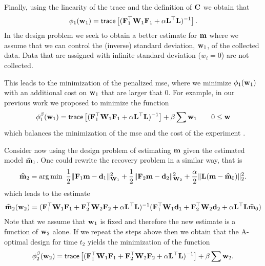 \documentclass[11pt]{article}
\newcommand{\bfC}	{{\bf{C}}}
\newcommand{\bfF}	{{\bf{F}}}
\newcommand{\bfL}	{{\bf{L}}}
\newcommand{\bfW}	{{\bf{W}}}
\newcommand{\bfd}	{{\bf{d}}}
\newcommand{\bfm}	{{\bf{m}}}
\newcommand{\bfw}	{{\bf{w}}}
\newcommand{\hf}        {{\frac 12}}
\newcommand{\LtL}       { \bfL^{\top}\bfL}
\renewcommand{\hf}		 {\frac12}
\newcommand{\bfmhat}    {{\widehat{\bfm}}}
\begin{document}
Finally, using the linearity of the trace and the definition of $\bfC$ we obtain that
\begin{eqnarray}
\label{design1}
\phi_{1}(\bfw_1 ) =  {\sf trace} \left[   (\bfF_{1}^{\top}\bfW_{1}\bfF_{1}   + 
 {\alpha} \LtL)^{-1} \right]. 
\end{eqnarray}
In the design problem we seek to obtain a better estimate for $\bfm$ where we assume
that we can control the (inverse) standard deviation, $\bfw_{1}$, of the collected data.
Data that are assigned with infinite standard deviation ($w_i = 0$) are not collected.
 
 This leads to the minimization of the penalized mse, where 
we minimize $\phi_{1}(\bfw_{1})$ with an additional cost on $\bfw_{1}$ that are larger that $0$.
 For example, in our
previous work we proposed to minimize the function
\begin{eqnarray}
\label{designp1}
\phi_{1}^{\beta}(\bfw_1 ) =  {\sf trace} \left[   (\bfF_{1}^{\top}\bfW_{1}\bfF_{1}   + 
 {\alpha} \LtL)^{-1} \right]  + \beta \sum \bfw_{1} \quad \quad 0 \le \bfw 
\end{eqnarray}
which balances the minimization of the mse and the cost of the experiment \cite{Haber2008}.


\bigskip

Consider now using the design problem of estimating $\bfm$ given the estimated model $\widehat \bfm_{1}$.
One could rewrite the recovery problem in a similar way,
that is
\begin{eqnarray}
\label{mest2}
\bfmhat_{2} = {\rm arg}\min\ \hf \| \bfF_{1} \bfm - \bfd_{1}\|^{2}_{\bfW_{1}} + \hf \| \bfF_{2} \bfm - \bfd_{2}\|^{2}_{\bfW_{2}}  + {\frac {\alpha} 2}
\|\bfL (\bfm -\bfmhat_{0}) \|^{2}_2. 
\end{eqnarray}
which leads to the estimate
\begin{eqnarray}
\label{mest2}
\bfmhat_{2}(\bfw_{2}) = (\bfF_{1}^{\top} \bfW_{1}\bfF_{1} +
\bfF_{2}^{\top} \bfW_{2}\bfF_{2} + \alpha \LtL)^{-1} (\bfF_{1}^{\top} \bfW_{1} \bfd_{1} +\bfF_{2}^{\top} \bfW_{2} \bfd_{2}
+ \alpha \LtL \bfmhat_{0})
\end{eqnarray}
Note that we assume that $\bfw_{1}$ is fixed and therefore the new estimate is a function of $\bfw_{2}$ alone.
If we repeat the steps above then we obtain that the A-optimal design for time $t_{2}$ yields the minimization of
the function
\begin{eqnarray}
\label{design2na}
\phi_{2}^{\beta}(\bfw_{2} ) =  {\sf trace} \left[   (\bfF_{1}^{\top}\bfW_{1}\bfF_{1}   + \bfF_{2}^{\top}\bfW_{2}\bfF_{2} +
\alpha \LtL)^{-1} \right] + \beta \sum \bfw_{2}. 
\end{eqnarray}
\end{document}
